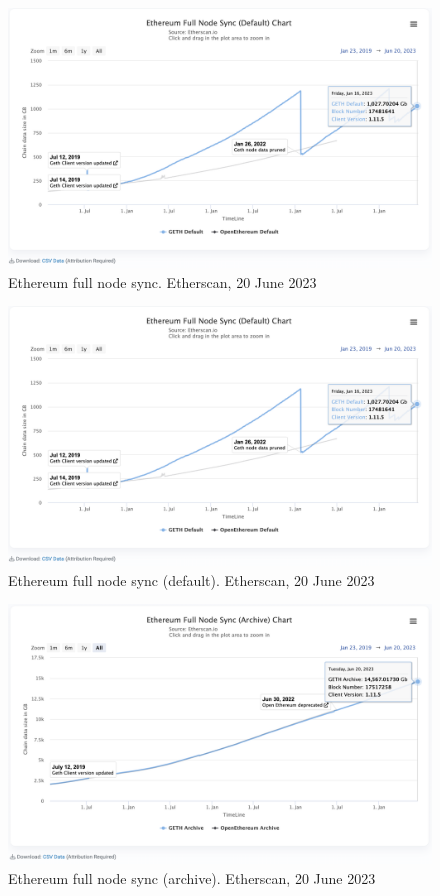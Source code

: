 \documentclass[UTF8]{article}
\begin{document}
\begin{figure}[htbp]
\begin{center}
\includegraphics[width=0.9\linewidth]{images/ethsync}
\caption{Ethereum full node sync. Etherscan, 20 June 2023}
\label{fig:ethsync}
\end{center}
\end{figure}

\begin{figure}[htbp]
\begin{center}
\includegraphics[width=0.9\linewidth]{images/ethsync}
\caption{Ethereum full node sync (default). Etherscan, 20 June 2023}
\label{fig:ethsync}
\end{center}
\end{figure}

\begin{figure}[htbp]
\begin{center}
\includegraphics[width=0.9\linewidth]{images/etharch}
\caption{Ethereum full node sync (archive). Etherscan, 20 June 2023}
\label{fig:etharch}
\end{center}
\end{figure}
\end{document}
